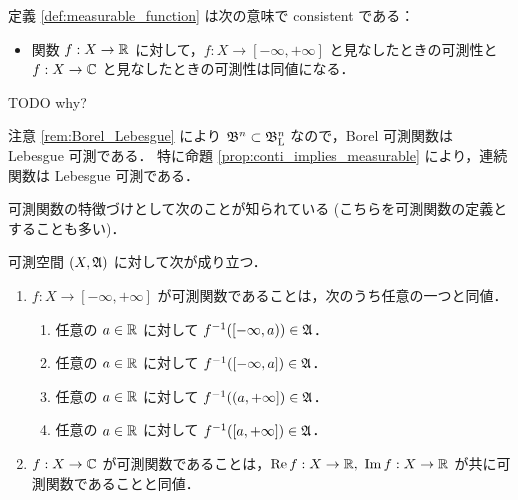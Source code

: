 \begin{remark}
    定義 \ref{def:measurable_function} は次の意味で consistent である：
    \begin{itemize}
        \item 関数 $f:X\to\mathbb{R}$ に対して，$f:X\to[-\infty,+\infty]$ と見なしたときの可測性と
        $f:X\to\mathbb{C}$ と見なしたときの可測性は同値になる．
    \end{itemize}
    {\color{red} TODO why?}
\end{remark}

\begin{remark}\label{rem:Borel_implies_Lebesgue}
    注意 \ref{rem:Borel_Lebesgue} により $\mathfrak{B}^n\subset\mathfrak{B}_{\mathrm{L}}^n$ なので，Borel 可測関数は Lebesgue 可測である．
    特に命題 \ref{prop:conti_implies_measurable} により，連続関数は Lebesgue 可測である．
\end{remark}

可測関数の特徴づけとして次のことが知られている (こちらを可測関数の定義とすることも多い)．

\begin{proposition}\label{prop:measurable_function_characterization}
    可測空間 $(X,\mathfrak{A})$ に対して次が成り立つ．
    \begin{enumerate}
        \item $f:X\to[-\infty,+\infty]$ が可測関数であることは，次のうち任意の一つと同値．
            \begin{enumerate}
                \item 任意の $a\in\mathbb{R}$ に対して $f^{-1}([-\infty,a))\in\mathfrak{A}$．
                \item 任意の $a\in\mathbb{R}$ に対して $f^{-1}([-\infty,a])\in\mathfrak{A}$．
                \item 任意の $a\in\mathbb{R}$ に対して $f^{-1}((a,+\infty])\in\mathfrak{A}$．
                \item 任意の $a\in\mathbb{R}$ に対して $f^{-1}([a,+\infty])\in\mathfrak{A}$．
            \end{enumerate}
        \item $f:X\to\mathbb{C}$ が可測関数であることは，$\operatorname{Re} f:X\to\mathbb{R},\ \operatorname{Im} f:X\to\mathbb{R}$ が共に可測関数であることと同値．
    \end{enumerate}
\end{proposition}

